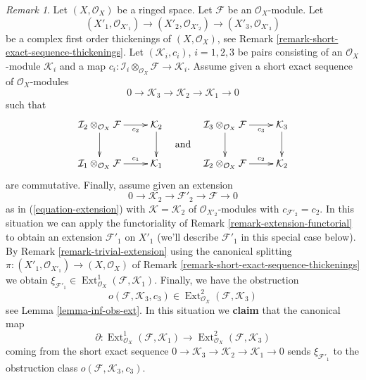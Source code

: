 \documentclass{stacks-project}
\theoremstyle{plain}
\theoremstyle{definition}
\theoremstyle{remark}
\newtheorem{remark}[subsection]{Remark}
\numberwithin{equation}{subsection}
\def\Ext{\mathop{\mathrm{Ext}}\nolimits}
\begin{document}
\begin{remark}
\label{remark-complex-thickenings-and-ses-modules}
Let $(X, \mathcal{O}_X)$ be a ringed space. Let $\mathcal{F}$ be an
$\mathcal{O}_X$-module. Let
$$
(X'_1, \mathcal{O}_{X'_1}) \to
(X'_2, \mathcal{O}_{X'_2}) \to
(X'_3, \mathcal{O}_{X'_3})
$$
be a complex first order thickenings of $(X, \mathcal{O}_X)$, see
Remark \ref{remark-short-exact-sequence-thickenings}.
Let $(\mathcal{K}_i, c_i)$, $i = 1, 2, 3$ be pairs consisting of
an $\mathcal{O}_X$-module $\mathcal{K}_i$ and a map
$c_i : \mathcal{I}_i \otimes_{\mathcal{O}_X} \mathcal{F} \to
\mathcal{K}_i$. Assume given a short exact sequence
of $\mathcal{O}_X$-modules
$$
0 \to \mathcal{K}_3 \to \mathcal{K}_2 \to \mathcal{K}_1 \to 0
$$
such that
$$
\vcenter{
\xymatrix{
\mathcal{I}_2 \otimes_{\mathcal{O}_X} \mathcal{F}
\ar[r]_-{c_2} \ar[d] &
\mathcal{K}_2 \ar[d] \\
\mathcal{I}_1 \otimes_{\mathcal{O}_X} \mathcal{F}
\ar[r]^-{c_1} &
\mathcal{K}_1
}
}
\quad\text{and}\quad
\vcenter{
\xymatrix{
\mathcal{I}_3 \otimes_{\mathcal{O}_X} \mathcal{F}
\ar[r]_-{c_3} \ar[d] &
\mathcal{K}_3 \ar[d] \\
\mathcal{I}_2 \otimes_{\mathcal{O}_X} \mathcal{F}
\ar[r]^-{c_2} &
\mathcal{K}_2
}
}
$$
are commutative. Finally, assume given an extension
$$
0 \to \mathcal{K}_2 \to \mathcal{F}'_2 \to \mathcal{F} \to 0
$$
as in (\ref{equation-extension}) with $\mathcal{K} = \mathcal{K}_2$
of $\mathcal{O}_{X'_2}$-modules with $c_{\mathcal{F}'_2} = c_2$.
In this situation we can apply the functoriality of
Remark \ref{remark-extension-functorial} to obtain an extension
$\mathcal{F}'_1$ on $X'_1$ (we'll describe $\mathcal{F}'_1$
in this special case below). By
Remark \ref{remark-trivial-extension}
using the canonical splitting
$\pi : (X'_1, \mathcal{O}_{X'_1}) \to (X, \mathcal{O}_X)$ of
Remark \ref{remark-short-exact-sequence-thickenings}
we obtain
$\xi_{\mathcal{F}'_1} \in
\Ext^1_{\mathcal{O}_X}(\mathcal{F}, \mathcal{K}_1)$.
Finally, we have the obstruction
$$
o(\mathcal{F}, \mathcal{K}_3, c_3) \in
\Ext^2_{\mathcal{O}_X}(\mathcal{F}, \mathcal{K}_3)
$$
see Lemma \ref{lemma-inf-obs-ext}.
In this situation we {\bf claim} that the canonical map
$$
\partial :
\Ext^1_{\mathcal{O}_X}(\mathcal{F}, \mathcal{K}_1)
\longrightarrow
\Ext^2_{\mathcal{O}_X}(\mathcal{F}, \mathcal{K}_3)
$$
coming from the short exact sequence
$0 \to \mathcal{K}_3 \to \mathcal{K}_2 \to \mathcal{K}_1 \to 0$
sends $\xi_{\mathcal{F}'_1}$
to the obstruction class $o(\mathcal{F}, \mathcal{K}_3, c_3)$.


\end{remark}
\end{document}

